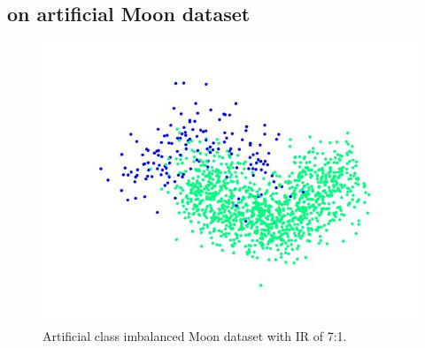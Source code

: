 \subsection{\Methodname{} on artificial Moon dataset}

\begin{figure}[h!]	
	\includegraphics[width=0.9\linewidth]{Figures/moon/ImbalancedData}
	\caption{Artificial class imbalanced Moon dataset with IR of 7:1.}
	\label{fig:raw_moon}
\end{figure}


